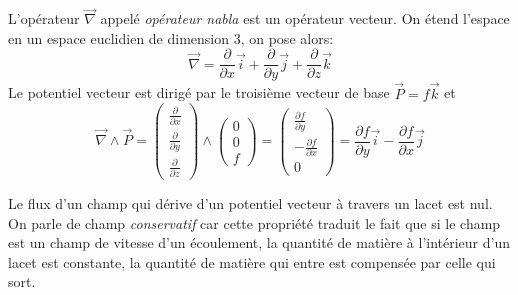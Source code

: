 L'opérateur $\overrightarrow{\nabla}$ appelé \emph{opérateur nabla} est un opérateur vecteur. On étend l'espace en un espace euclidien de dimension 3, on pose alors:
\begin{displaymath}
 \overrightarrow{\nabla} = \frac{\partial}{\partial x}\overrightarrow i +
 \frac{\partial}{\partial y}\overrightarrow j +
\frac{\partial}{\partial z}\overrightarrow k
\end{displaymath}
Le potentiel vecteur est dirigé par le troisième vecteur de base $\overrightarrow P = f\overrightarrow k$ et
\renewcommand{\arraystretch}{1.5}
\begin{displaymath}
 \overrightarrow{\nabla}\wedge \overrightarrow P
=\begin{pmatrix}
  \frac{\partial}{\partial x}\\\frac{\partial}{\partial y}\\\frac{\partial}{\partial z}
 \end{pmatrix}
\wedge
\begin{pmatrix}
 0\\0\\f
\end{pmatrix}
=
\begin{pmatrix}
\frac{\partial f}{\partial y}\\ -\frac{\partial f}{\partial x}\\0
\end{pmatrix}
= \frac{\partial f}{\partial y}\overrightarrow i - \frac{\partial f}{\partial x}\overrightarrow j
\end{displaymath}
\begin{rem}
 Le flux d'un champ qui dérive d'un potentiel vecteur à travers un lacet est nul. On parle de champ \emph{conservatif} car cette propriété traduit le fait que si le champ est un champ de vitesse d'un écoulement, la quantité de matière à l'intérieur d'un lacet est constante, la quantité de matière qui entre est compensée par celle qui sort.
\end{rem}

